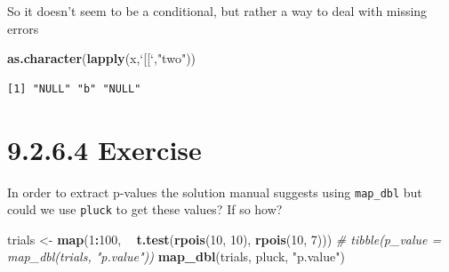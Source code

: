 \documentclass[]{book}
\newenvironment{Shaded}{\begin{snugshade}}{\end{snugshade}}
\newcommand{\CommentTok}[1]{\textcolor[rgb]{0.56,0.35,0.01}{\textit{#1}}}
\newcommand{\DataTypeTok}[1]{\textcolor[rgb]{0.13,0.29,0.53}{#1}}
\newcommand{\DecValTok}[1]{\textcolor[rgb]{0.00,0.00,0.81}{#1}}
\newcommand{\KeywordTok}[1]{\textcolor[rgb]{0.13,0.29,0.53}{\textbf{#1}}}
\newcommand{\NormalTok}[1]{#1}
\newcommand{\OperatorTok}[1]{\textcolor[rgb]{0.81,0.36,0.00}{\textbf{#1}}}
\newcommand{\StringTok}[1]{\textcolor[rgb]{0.31,0.60,0.02}{#1}}
\begin{document}
So it doesn't seem to be a conditional, but rather a way to deal with missing errors

\begin{Shaded}
\begin{Highlighting}[]
\KeywordTok{as.character}\NormalTok{(}\KeywordTok{lapply}\NormalTok{(x,}\StringTok{`}\DataTypeTok{[[}\StringTok{`}\NormalTok{,}\StringTok{"two"}\NormalTok{))}
\end{Highlighting}
\end{Shaded}

\begin{verbatim}
[1] "NULL" "b" "NULL"
\end{verbatim}

\hypertarget{exercise-8}{%
\section*{9.2.6.4 Exercise}\label{exercise-8}}

In order to extract p-values the solution manual suggests using \texttt{map\_dbl} but could we use \texttt{pluck} to get these values? If so how?

\begin{Shaded}
\begin{Highlighting}[]
\NormalTok{trials <-}\StringTok{ }\KeywordTok{map}\NormalTok{(}\DecValTok{1}\OperatorTok{:}\DecValTok{100}\NormalTok{, }\OperatorTok{~}\StringTok{ }\KeywordTok{t.test}\NormalTok{(}\KeywordTok{rpois}\NormalTok{(}\DecValTok{10}\NormalTok{, }\DecValTok{10}\NormalTok{), }\KeywordTok{rpois}\NormalTok{(}\DecValTok{10}\NormalTok{, }\DecValTok{7}\NormalTok{)))}
\CommentTok{# tibble(p_value = map_dbl(trials, "p.value"))}
\KeywordTok{map_dbl}\NormalTok{(trials, pluck, }\StringTok{"p.value"}\NormalTok{)}
\end{Highlighting}
\end{Shaded}
\end{document}
